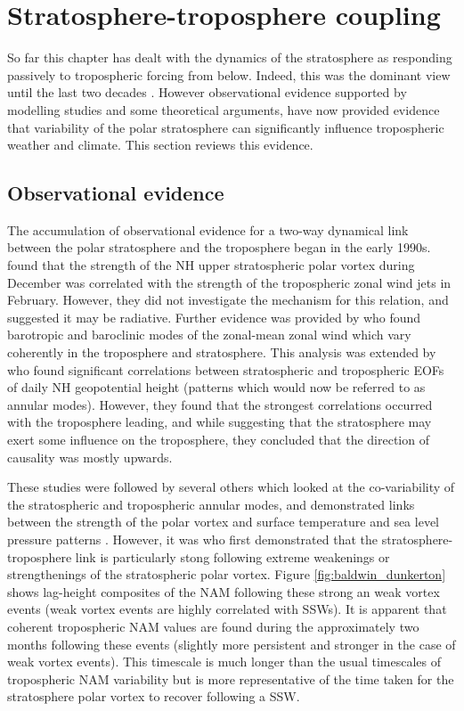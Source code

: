 \section{Stratosphere-troposphere coupling}
\label{sec:strat-trop-coupl}

So far this chapter has dealt with the dynamics of the stratosphere as
responding passively to tropospheric forcing from below. Indeed, this was the
dominant view until the last two decades \citep[e.g.,][]{Andrews1987}. However
observational evidence supported by modelling studies and some theoretical
arguments, have now provided evidence that variability of the polar stratosphere
can significantly influence tropospheric weather and climate. This section
reviews this evidence.



\subsection{Observational evidence}
\label{sec:observ-evid}

The accumulation of observational evidence for a two-way dynamical link between
the polar stratosphere and the troposphere began in the early
1990s. \citet{Kodera1990} found that the strength of the NH upper stratospheric
polar vortex during December was correlated with the strength of the
tropospheric zonal wind jets in February. However, they did not investigate the
mechanism for this relation, and suggested it may be radiative. Further evidence
was provided by \citet{Nigam1990} who found barotropic and baroclinic modes of
the zonal-mean zonal wind which vary coherently in the troposphere and
stratosphere. This analysis was extended by \citet{Baldwin1994} who found
significant correlations between stratospheric and tropospheric EOFs of daily NH
geopotential height (patterns which would now be referred to as annular
modes). However, they found that the strongest correlations occurred with the
troposphere leading, and while suggesting that the stratosphere may exert some
influence on the troposphere, they concluded that the direction of causality was
mostly upwards.

These studies were followed by several others which looked at the co-variability
of the stratospheric and tropospheric annular modes, and demonstrated links
between the strength of the polar vortex and surface temperature and sea level
pressure patterns \citep{Perlwitz1995, Thompson1998,Baldwin1999}. However, it
was \citet{Baldwin2001a} who first demonstrated that the
stratosphere-troposphere link is particularly stong following extreme weakenings
or strengthenings of the stratospheric polar vortex. Figure
\ref{fig:baldwin_dunkerton} shows lag-height composites of the NAM following
these strong an weak vortex events (weak vortex events are highly correlated
with SSWs). It is apparent that coherent tropospheric NAM values are found
during the approximately two months following these events (slightly more
persistent and stronger in the case of weak vortex events). This timescale is
much longer than the usual timescales of tropospheric NAM variability
\citep[e.g.,][]{Simpson2011} but is more representative of the time taken for
the stratosphere polar vortex to recover following a SSW.


